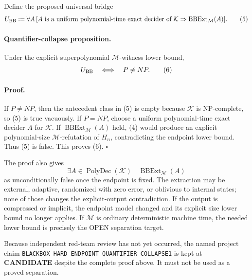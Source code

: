 \documentclass[11pt]{article}
\newcommand{\CAND}{\textbf{CANDIDATE}}
\begin{document}
Define the proposed universal bridge
\[
 U_{\rm BB}:=
 \forall A\,[A\text{ is a uniform polynomial-time exact decider of }\mathcal K
 \Rightarrow \operatorname{BBExt}_{\mathcal M}(A)].        \tag{5}
\]

\paragraph{Quantifier-collapse proposition.}
Under the explicit superpolynomial $\mathcal M$-witness lower bound,
\[
                         U_{\rm BB}\quad\Longleftrightarrow\quad P\ne NP.
                                                                    \tag{6}
\]

\paragraph{Proof.}
If $P\ne NP$, then the antecedent class in (5) is empty because $\mathcal K$
is NP-complete, so (5) is true vacuously.  If $P=NP$, choose a uniform
polynomial-time exact decider $A$ for $\mathcal K$.  If
$\operatorname{BBExt}_{\mathcal M}(A)$ held, (4) would produce an explicit
polynomial-size $\mathcal M$-refutation of $H_n$, contradicting the endpoint
lower bound.  Thus (5) is false.  This proves (6). \(\square\)

The proof also gives
\[
 \exists A\in\operatorname{PolyDec}(\mathcal K)\quad
 \operatorname{BBExt}_{\mathcal M}(A)                    \tag{7}
\]
as unconditionally false once the endpoint is fixed.  The extraction may be
external, adaptive, randomized with zero error, or oblivious to internal
states; none of those changes the explicit-output contradiction.  If the
output is compressed or implicit, the endpoint model changed and its explicit
size lower bound no longer applies.  If $\mathcal M$ is ordinary deterministic
machine time, the needed lower bound is precisely the OPEN separation target.

Because independent red-team review has not yet occurred, the named project
claim \texttt{BLACKBOX-HARD-ENDPOINT-QUANTIFIER-COLLAPSE1} is kept at
\CAND{} despite the complete proof above.  It must not be used as a proved
separation.
\end{document}
